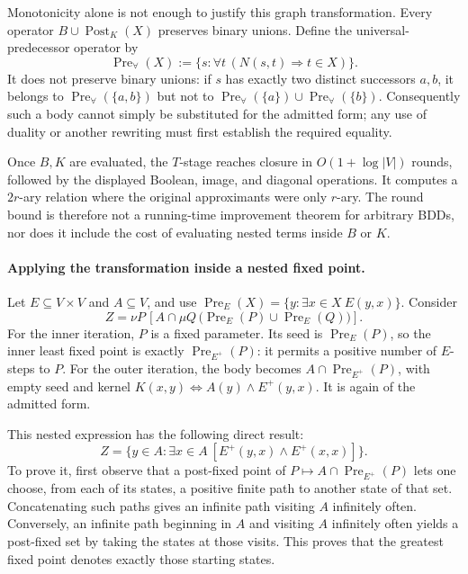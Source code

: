Monotonicity alone is not enough to justify this graph
transformation. Every operator \(B\cup\operatorname{Post}_K(X)\)
preserves binary unions. Define the universal-predecessor operator by
\[
 \operatorname{Pre}_{\forall}(X)
  :=\{s:\forall t\,(N(s,t)\Rightarrow t\in X)\}.
\]
It does not preserve binary unions: if \(s\) has exactly two distinct successors
\(a,b\), it belongs to
\(\operatorname{Pre}_{\forall}(\{a,b\})\) but not to
\(\operatorname{Pre}_{\forall}(\{a\})\cup
  \operatorname{Pre}_{\forall}(\{b\})\).
Consequently such a body cannot simply be substituted
for the admitted form; any use of duality or another
rewriting must first establish the required equality.

Once \(B,K\) are evaluated, the \(T\)-stage reaches closure
in \(O(1+\log|V|)\) rounds, followed by the displayed
Boolean, image, and diagonal operations. It computes
a \(2r\)-ary relation where the original approximants
were only \(r\)-ary. The round bound is therefore not
a running-time improvement theorem for arbitrary BDDs,
nor does it include the cost of evaluating nested terms
inside \(B\) or \(K\).

\paragraph{Applying the transformation inside a nested fixed point.}
Let \(E\subseteq V\times V\) and \(A\subseteq V\), and use
\(\operatorname{Pre}_E(X)=\{y:\exists x\in X\ E(y,x)\}\).
Consider
\[
 Z=\nu P\,
   \left[A\cap
      \mu Q\,\bigl(\operatorname{Pre}_E(P)
                     \cup\operatorname{Pre}_E(Q)\bigr)\right].
\]
For the inner iteration, \(P\) is a fixed parameter.
Its seed is \(\operatorname{Pre}_E(P)\), so the inner
least fixed point is exactly
\(\operatorname{Pre}_{E^+}(P)\): it permits a positive
number of \(E\)-steps to \(P\).
For the outer iteration, the body becomes
\(A\cap\operatorname{Pre}_{E^+}(P)\), with empty seed
and kernel \(K(x,y)\iff A(y)\land E^+(y,x)\).
It is again of the admitted form.

This nested expression has the following direct result:
\[
 Z=\{y\in A:\exists x\in A\
                       [E^+(y,x)\land E^+(x,x)]\}.
\]
To prove it, first observe that a post-fixed point of
\(P\mapsto A\cap\operatorname{Pre}_{E^+}(P)\) lets one
choose, from each of its states, a positive finite path
to another state of that set. Concatenating such paths
gives an infinite path visiting \(A\) infinitely often.
Conversely, an infinite path beginning in \(A\) and
visiting \(A\) infinitely often yields a post-fixed set
by taking the states at those visits. This proves that
the greatest fixed point denotes exactly those starting
states.

